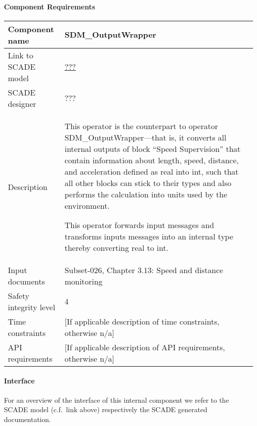 
\paragraph{Component Requirements}

\begin{longtable}{p{}p{}}
\toprule
Component name			& SDM\_OutputWrapper \\
\midrule
Link to SCADE model		& {\footnotesize \url{???}} \\
\midrule
SCADE designer			& ??? \\
\midrule
Description				& This operator is the counterpart to operator SDM\_OutputWrapper---that is, it converts all internal outputs of block ``Speed Supervision'' that contain information about length, speed, distance, and acceleration defined as real into int, such that all other blocks can stick to their types and also performs the calculation into units used by the environment.

This operator forwards input messages and transforms inputs messages into an internal type thereby converting real to int.\\
\midrule
Input documents	& 
Subset-026, Chapter 3.13: Speed and distance monitoring \\
\midrule
Safety integrity level		& 4 \\
\midrule
Time constraints		& [If applicable description of time constraints, otherwise n/a] \\
\midrule
API requirements 		& [If applicable description of API requirements, otherwise n/a] \\
\bottomrule
\end{longtable}



\paragraph{Interface}

For an overview of the interface of this internal component we refer to the SCADE model (c.f.~link above) respectively the SCADE generated documentation.
